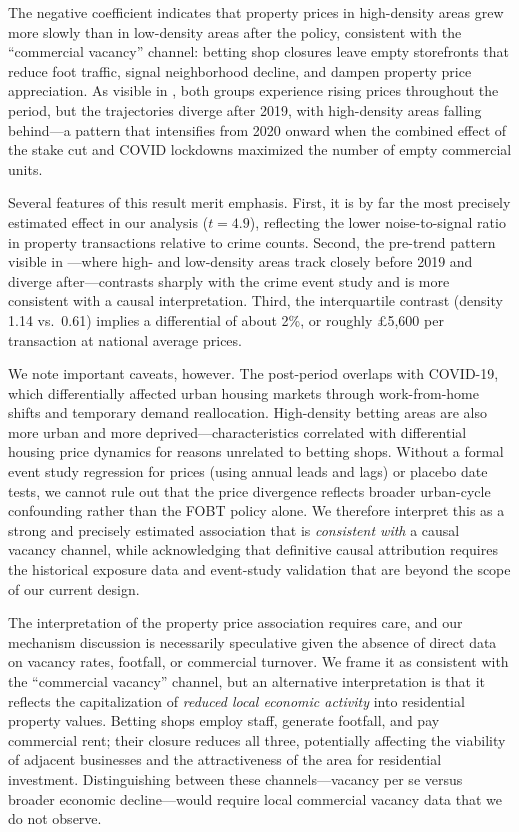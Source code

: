 \documentclass[12pt]{article}
\begin{document}
The negative coefficient indicates that property prices in high-density areas grew more slowly than in low-density areas after the policy, consistent with the ``commercial vacancy'' channel: betting shop closures leave empty storefronts that reduce foot traffic, signal neighborhood decline, and dampen property price appreciation. As visible in , both groups experience rising prices throughout the period, but the trajectories diverge after 2019, with high-density areas falling behind---a pattern that intensifies from 2020 onward when the combined effect of the stake cut and COVID lockdowns maximized the number of empty commercial units.

Several features of this result merit emphasis. First, it is by far the most precisely estimated effect in our analysis ($t = 4.9$), reflecting the lower noise-to-signal ratio in property transactions relative to crime counts. Second, the pre-trend pattern visible in ---where high- and low-density areas track closely before 2019 and diverge after---contrasts sharply with the crime event study and is more consistent with a causal interpretation. Third, the interquartile contrast (density 1.14 vs.\ 0.61) implies a differential of about 2\%, or roughly \pounds5,600 per transaction at national average prices.

We note important caveats, however. The post-period overlaps with COVID-19, which differentially affected urban housing markets through work-from-home shifts and temporary demand reallocation. High-density betting areas are also more urban and more deprived---characteristics correlated with differential housing price dynamics for reasons unrelated to betting shops. Without a formal event study regression for prices (using annual leads and lags) or placebo date tests, we cannot rule out that the price divergence reflects broader urban-cycle confounding rather than the FOBT policy alone. We therefore interpret this as a strong and precisely estimated association that is \textit{consistent with} a causal vacancy channel, while acknowledging that definitive causal attribution requires the historical exposure data and event-study validation that are beyond the scope of our current design.

The interpretation of the property price association requires care, and our mechanism discussion is necessarily speculative given the absence of direct data on vacancy rates, footfall, or commercial turnover. We frame it as consistent with the ``commercial vacancy'' channel, but an alternative interpretation is that it reflects the capitalization of \textit{reduced local economic activity} into residential property values. Betting shops employ staff, generate footfall, and pay commercial rent; their closure reduces all three, potentially affecting the viability of adjacent businesses and the attractiveness of the area for residential investment. Distinguishing between these channels---vacancy per se versus broader economic decline---would require local commercial vacancy data that we do not observe.
\end{document}
